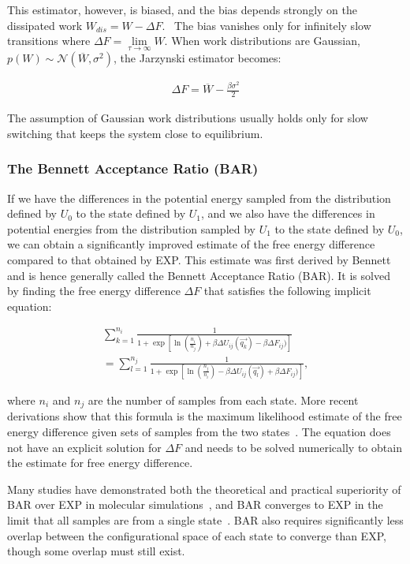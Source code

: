 \documentclass[9pt,bestpractices]{livecoms}
\begin{document}
This estimator, however, is biased, and the bias depends strongly on the dissipated work $W_{dis}=W-\Delta F$.~\cite{gore2003bias}
The bias vanishes only for infinitely slow transitions where $\Delta F = \lim\limits_{\tau \to \infty} W$.
When work distributions are Gaussian, $p(W) \sim \mathcal{N}(\overline{W},\sigma^2)$, the Jarzynski estimator becomes:

\begin{eqnarray}
\Delta F = \overline{W} - \frac{\beta\sigma^2}{2}
\end{eqnarray}\label{eqn.jarzynski_gaussian}

The assumption of Gaussian work distributions usually holds only for slow switching that keeps the system close to equilibrium.~\cite{jarzynski1997nonequilibrium}

\subsubsection{The Bennett Acceptance Ratio (BAR)}
If we have the differences in the potential energy sampled from the distribution defined by $U_0$ to the state defined by $U_1$, and we also have the differences in potential energies from the distribution sampled by $U_1$ to the state defined by $U_0$, we can obtain a significantly improved estimate of the
free energy difference compared to that obtained by EXP. 
This estimate was first derived by Bennett and is hence generally called the Bennett Acceptance Ratio (BAR). It is solved by finding the free energy difference $\Delta F$ that satisfies the following implicit equation:

\begin{eqnarray}
 \sum_{k=1}^{n_i} \frac{1}{1 + \exp[\ln(\frac{n_i}{n_j}) + \beta \Delta U_{ij}(\vec{q_k}) - \beta \Delta F_{ij})
 ]} \nonumber \\
 =\sum_{l=1}^{n_j} \frac{1}{1 + \exp[\ln(\frac{n_j}{n_i}) - \beta \Delta U_{ij}(\vec{q_l}) + \beta \Delta F_{ij})]},
\end{eqnarray}\label{eq:bar}

where $n_i$ and $n_j$ are the number of samples from each state. More recent derivations show that this formula is the maximum likelihood estimate of the free energy difference given sets of samples from the two states~\cite{shirts2003equilibrium}. 
The equation does not have an explicit solution for $\Delta F$ and needs to be solved numerically to obtain the estimate for free energy difference.

Many studies have demonstrated both the theoretical and practical superiority of BAR over EXP in molecular
simulations~\cite{shirts2005comparison,lu2003appropriate}, and BAR converges to EXP in the limit that all samples are from a single state~\cite{bennett1976efficient,bennett1976efficient,shirts2003equilibrium}. BAR also requires significantly less overlap between the configurational space of each state to converge than EXP, though some overlap must still exist.
\end{document}
